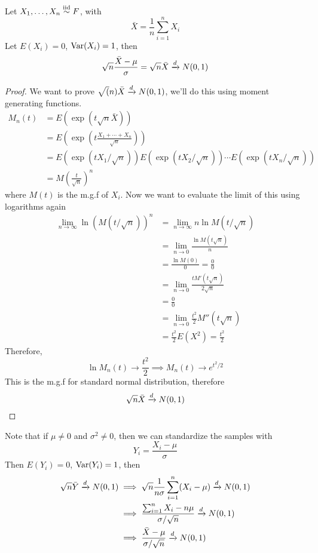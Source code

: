 \begin{theorem}
    Let $X_1, \ldots, X_n \overset{\mathrm{iid}}{\sim} F$, with 
    \[\bar{X} = \frac{1}{n}\sum_{i=1}^n X_i\]
    Let $E(X_i) = 0$, $\operatorname{Var}(X_i) = 1$, then 
    \[\sqrt{n}\frac{\bar{X} - \mu}{\sigma} = \sqrt{n}\bar{X} \xrightarrow{d} N(0,1)\]
\end{theorem}
\begin{proof}
    We want to prove $\sqrt(n)\bar{X} \xrightarrow{d} N(0,1)$, we'll do this using moment generating functions. 
    \begin{align*}
        M_n(t) &= E(\exp(t\sqrt{n}\bar{X}))\\
        &= E\left(\exp\left(t \frac{X_1 + \cdots + X_n}{\sqrt{n}}\right)\right)\\
        &= E(\exp(tX_1/\sqrt{n}))E(\exp(tX_2/\sqrt{n}))\cdots E(\exp(tX_n/\sqrt{n}))\\
        &= M\left(\frac{t}{\sqrt{n}}\right)^n
    \end{align*}
    where $M(t)$ is the m.g.f of $X_i$. Now we want to evaluate the limit of this using logarithms again
    \begin{align*}
        \lim_{n\rightarrow\infty} \ln (M(t/\sqrt{n}))^n &= \lim_{n\rightarrow\infty} n\ln M(t/\sqrt{n})\\
        &= \lim_{n\rightarrow 0}\frac{\ln M(t\sqrt{n})}{n}\tag{Replace $n$ with $1/n$}\\
        &= \frac{\ln M(0)}{0} = \frac{0}{0}\tag{Use L'Hoptial's Rule}\\
        &= \lim_{n\rightarrow 0} \frac{tM'(t\sqrt{n})}{2\sqrt{n}}\\
        &= \frac{0}{0}\tag{$M'(0) = \mu = 0$}\\
        &= \lim_{n\rightarrow 0} \frac{t^2}{2}M''(t\sqrt{n})\\
        &= \frac{t^2}{2}E(X^2) =\frac{t^2}{2}
    \end{align*}
    Therefore,
    \[\ln M_n(t) \rightarrow \frac{t^2}{2} \implies M_n(t) \rightarrow e^{t^2/2}\]
    This is the m.g.f for standard normal distribution, therefore 
    \[\sqrt{n}\bar{X} \xrightarrow{d} N(0,1)\]
\end{proof}
Note that if $\mu \neq 0$ and $\sigma^2 \neq 0$, then we can standardize the samples with 
\[Y_i = \frac{X_i - \mu}{\sigma}\] 
Then $E(Y_i) = 0$, $\operatorname{Var}(Y_i) = 1$, then 
\begin{align*}
    \sqrt{n}\bar{Y} \xrightarrow{d} N(0,1) &\implies \sqrt{n}\frac{1}{n\sigma}\sum_{i=1}^n(X_i-\mu) \xrightarrow{d} N(0,1)\\
    &\implies \frac{\sum_{i=1}^n X_i - n\mu}{\sigma/\sqrt{n}}\xrightarrow{d} N(0,1)\\
    &\implies \frac{\bar{X} - \mu}{\sigma/\sqrt{n}} \xrightarrow{d} N(0,1)
\end{align*}
